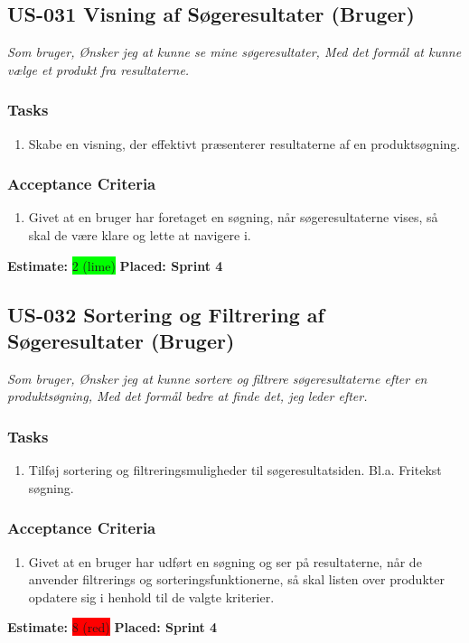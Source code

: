 \subsection{US-031 Visning af Søgeresultater (Bruger)}
\label{sec:US-031}
\textit{Som bruger, Ønsker jeg at kunne se mine søgeresultater, Med det formål at kunne vælge et produkt fra resultaterne.}
\subsubsection*{\textbf{Tasks}}
\begin{enumerate}
  \item Skabe en visning, der effektivt præsenterer resultaterne af en produktsøgning.
\end{enumerate}
\subsubsection*{\textbf{Acceptance Criteria}}
\begin{enumerate}
  \item Givet at en bruger har foretaget en søgning, når søgeresultaterne vises, så skal de være klare og lette at navigere i.
\end{enumerate}
\textbf{Estimate:} \colorbox{lime}{2 (lime)}
\textbf{Placed: Sprint 4}
\par\noindent\dotfill

\subsection{US-032 Sortering og Filtrering af Søgeresultater (Bruger)}
\label{sec:US-032}
\textit{Som bruger, Ønsker jeg at kunne sortere og filtrere søgeresultaterne efter en produktsøgning, Med det formål bedre at finde det, jeg leder efter.}
\subsubsection*{\textbf{Tasks}}
\begin{enumerate}
  \item Tilføj sortering og filtreringsmuligheder til søgeresultatsiden. Bl.a. Fritekst søgning.
\end{enumerate}
\subsubsection*{\textbf{Acceptance Criteria}}
\begin{enumerate}
  \item Givet at en bruger har udført en søgning og ser på resultaterne, når de anvender filtrerings og sorteringsfunktionerne, så skal listen over produkter opdatere sig i henhold til de valgte kriterier.
\end{enumerate}
\textbf{Estimate:} \colorbox{red}{8 (red)}
\textbf{Placed: Sprint 4}
\par\noindent\dotfill

